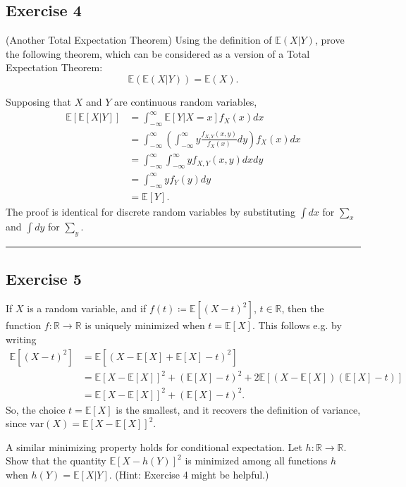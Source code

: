 \documentclass{article}
\theoremstyle{break}
\renewenvironment{proof}{{\bf Proof:}}{\hfill\rule{2mm}{2mm}}
\newcommand{\E}{\mathbb{E}}
\newcommand{\var}{\mathrm{var}}
\newcommand{\R}{\mathbb{R}}
\begin{document}
\subsection*{Exercise 4}
(Another Total Expectation Theorem)
Using the definition of $\E(X|Y)$, prove the following theorem, which can be considered as a version of a Total Expectation Theorem:
\[ \E( \E(X|Y)) = \E(X).
\]

\begin{proof}
Supposing that $X$ and $Y$ are continuous random variables,
\begin{align*}
	\E[\E[X|Y]] &= \int_{-\infty}^\infty \E[Y | X = x ] f_X(x) dx \\
		&= \int_{-\infty}^\infty \left( \int_{-\infty}^\infty y \frac{f_{X,Y}(x,y)}{f_X(x)} dy \right) f_X(x) dx \\
		&= \int_{-\infty}^\infty \int_{-\infty}^\infty y f_{X,Y}(x,y) dx dy \\
		&= \int_{-\infty}^\infty y f_Y(y) dy \\
		&= \E[Y].
\end{align*}
The proof is identical for discrete random variables by substituting $\int dx$ for $\sum_x$ and $\int dy$ for $\sum_y$.
\end{proof}



\subsection*{Exercise 5}
If $X$ is a random variable, and if $f(t) \coloneqq \E[(X - t)^2]$, $t \in \R$, then the function $f: \R \rightarrow \R$ is uniquely minimized when $t = \E[X]$. This follows e.g. by writing
\begin{align*}
\E[(X-t)^2] &= \E[(X - \E[X] + \E[X] - t)^2] \\
	&= \E[X - \E[X]]^2 + (\E[X] - t)^2 + 2 \E[(X - \E[X])(\E[X] - t)] \\
	&= \E[X - \E[X]]^2 + (\E[X] - t)^2.
\end{align*}
So, the choice $t = \E[X]$ is the smallest, and it recovers the definition of variance, since $\var(X) = \E[X - \E[X]]^2$. 

A similar minimizing property holds for conditional expectation. Let $h: \R \rightarrow \R$. Show that the quantity $\E[X - h(Y)]^2$ is minimized among all functions $h$ when $h(Y) = \E[X|Y]$. (Hint: Exercise 4 might be helpful.)
\end{document}
